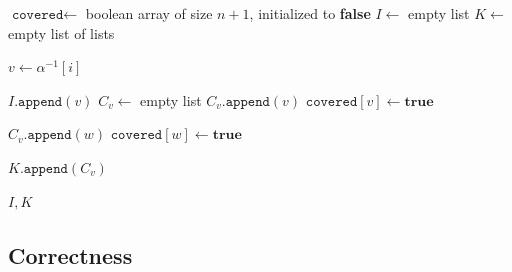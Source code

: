 \begin{algorithm}[H]
\caption{Max Independent Set \& Min Clique Cover}
\begin{algorithmic}[1]
    \State $\texttt{covered} \gets$ boolean array of size $n+1$, initialized to \textbf{false}
    \State $I \gets$ empty list 
    \State $K \gets$ empty list of lists 
    
        \State $v \gets \alpha^{-1}[i]$
        
            \State $I.\texttt{append}(v)$
            \State $C_v \gets$ empty list
            \State $C_v.\texttt{append}(v)$
            \State $\texttt{covered}[v] \gets \textbf{true}$
            
                \If{$\alpha[v] < \alpha[w]$}
                    \State $C_v.\texttt{append}(w)$
                    \State $\texttt{covered}[w] \gets \textbf{true}$
                \EndIf
            \EndFor
            
            \State $K.\texttt{append}(C_v)$
        \EndIf
    \EndFor
    
    \State \Return $I, K$
\EndFunction
\end{algorithmic}
\end{algorithm}

\subsection{Correctness}

